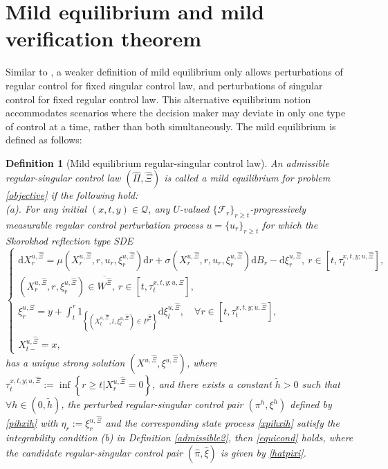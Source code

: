 \documentclass[11pt,reqno]{article}%
\newtheorem{definition}[theorem]{Definition}
\numberwithin{equation}{section}
\begin{document}
\section{Mild equilibrium and mild verification theorem}\label{mild}
Similar to \citet{liang2023weak}, a weaker definition of mild equilibrium only allows perturbations of regular control for fixed singular control law, and perturbations of singular control for fixed regular control law. This alternative equilibrium notion accommodates scenarios where the decision maker may deviate in only one type of control at a time, rather than both simultaneously. The mild equilibrium is defined as follows:
\begin{definition}[Mild equilibrium regular-singular control law]
\label{mildequil}
An admissible regular-singular control law $\left(\hat{\Pi},\hat{\Xi}\right)$ is called a mild equilibrium for problem \eqref{objective} if the following hold:\\
(a). For any initial $(x,t,y)\in\mathcal{Q}$, any $U$-valued $\{\mathcal{F}_{r}\}_{r\ge t}$-progressively measurable regular control perturbation process $u=\{u_{r}\}_{r\ge t}$ for which the Skorokhod reflection type SDE
\begin{equation}
\left\{\begin{array}{l}
\mathrm{d}X^{u,\hat{\Xi}}_{r}=\mu\left(X^{u,\hat{\Xi}}_{r},r,u_{r},\xi^{u,\hat{\Xi}}_{r}\right)\mathrm{d}r+\sigma\left(X^{u,\hat{\Xi}}_{r},r,u_{r},\xi^{u,\hat{\Xi}}_{r}\right)\mathrm{d}B_{r}-\mathrm{d}\xi^{u,\hat{\Xi}}_{r},\ r\in[t,\tau^{x,t,y;u,\hat{\Xi}}_{t}],\\
\left(X^{u,\hat{\Xi}}_{r},r,\xi^{u,\hat{\Xi}}_{r}\right)\in \overline{W^{\hat{\Xi}}},\ r\in[t,\tau^{x,t,y;u,\hat{\Xi}}_{t}],\\
\xi^{u,\hat{\Xi}}_{r}=y+\int_{t}^{r}1_{\left\{\left(X^{u,\hat{\Xi}}_{l},l,\xi^{u,\hat{\Xi}}_{l}\right)\in P^{\hat{\Xi}}\right\}}\mathrm{d}\xi^{u,\hat{\Xi}}_{l},\quad\forall r\in[t,\tau^{x,t,y;u,\hat{\Xi}}_{t}],\\
X^{u,\hat{\Xi}}_{t-}=x,
\end{array}\right.\nonumber
\end{equation}
has a unique strong solution $\left(X^{u,\hat{\Xi}},\xi^{u,\hat{\Xi}}\right)$, where $\tau^{x,t,y;u,\hat{\Xi}}_{t}:=\inf\left\{r\ge t|X^{u,\hat{\Xi}}_{r}= 0\right\}$, and there exists a constant $\tilde{h}>0$ such that $\forall h\in(0,\tilde{h})$, the perturbed regular-singular control pair $\left(\pi^{h},\xi^{h}\right)$ defined by \eqref{pihxih} with $\eta_r:=\xi^{u,\hat{\Xi}}_r$ and the corresponding state process \eqref{xpihxih} satisfy the integrability condition (b) in Definition \ref{admissible2}, then \eqref{equicond} holds, where the candidate regular-singular control pair $\left(\hat{\pi},\hat{\xi}\right)$ is given by \eqref{hatpixi}.\\%

\end{definition}
\end{document}

